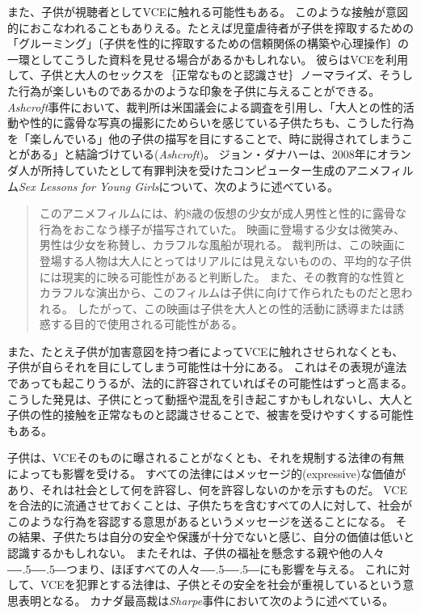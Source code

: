 \documentclass[paper=a4,book,openany]{jlreq}
\def\DDASH{―\kern-.5\zw―\kern-.5\zw―} %
\begin{document}
また、子供が視聴者としてVCEに触れる可能性もある。
このような接触が意図的におこなわれることもありえる。たとえば児童虐待者が子供を搾取するための「グルーミング」〔子供を性的に搾取するための信頼関係の構築や心理操作〕の一環としてこうした資料を見せる場合があるかもしれない。
彼らはVCEを利用して、子供と大人のセックスを｛正常なものと認識させ｝{ノーマライズ}、そうした行為が楽しいものであるかのような印象を子供に与えることができる。
\emph{Ashcroft}事件において、裁判所は米国議会による調査を引用し、「大人との性的活動や性的に露骨な写真の撮影にためらいを感じている子供たちも、こうした行為を「楽しんでいる」他の子供の描写を目にすることで、時に説得されてしまうことがある」と結論づけている(\emph{Ashcroft})。
ジョン・ダナハーは、2008年にオランダ人が所持していたとして有罪判決を受けたコンピューター生成のアニメフィルム\emph{Sex Lessons for Young Girls}について、次のように述べている。

\begin{quote}
このアニメフィルムには、約8歳の仮想の少女が成人男性と性的に露骨な行為をおこなう様子が描写されていた。
映画に登場する少女は微笑み、男性は少女を称賛し、カラフルな風船が現れる。
裁判所は、この映画に登場する人物は大人にとってはリアルには見えないものの、平均的な子供には現実的に映る可能性があると判断した。
また、その教育的な性質とカラフルな演出から、このフィルムは子供に向けて作られたものだと思われる。
したがって、この映画は子供を大人との性的活動に誘導または誘惑する目的で使用される可能性がある。\citep[pp.137--138]{strikwerda17:_legal_moral_implic_child_sex_robot}
\end{quote}

また、たとえ子供が加害意図を持つ者によってVCEに触れさせられなくとも、子供が自らそれを目にしてしまう可能性は十分にある。
これはその表現が違法であっても起こりうるが、法的に許容されていればその可能性はずっと高まる。
こうした発見は、子供にとって動揺や混乱を引き起こすかもしれないし、大人と子供の性的接触を正常なものと認識させることで、被害を受けやすくする可能性もある。

子供は、VCEそのものに曝されることがなくとも、それを規制する法律の有無によっても影響を受ける。
すべての法律にはメッセージ的(expressive)な価値があり、それは社会として何を許容し、何を許容しないのかを示すものだ。
VCEを合法的に流通させておくことは、子供たちを含むすべての人に対して、社会がこのような行為を容認する意思があるというメッセージを送ることになる。
その結果、子供たちは自分の安全や保護が十分でないと感じ、自分の価値は低いと認識するかもしれない。
またそれは、子供の福祉を懸念する親や他の人々{\DDASH}つまり、ほぼすべての人々{\DDASH}にも影響を与える。
これに対して、VCEを犯罪とする法律は、子供とその安全を社会が重視しているという意思表明となる。
カナダ最高裁は\emph{Sharpe}事件において次のように述べている。
\end{document}
